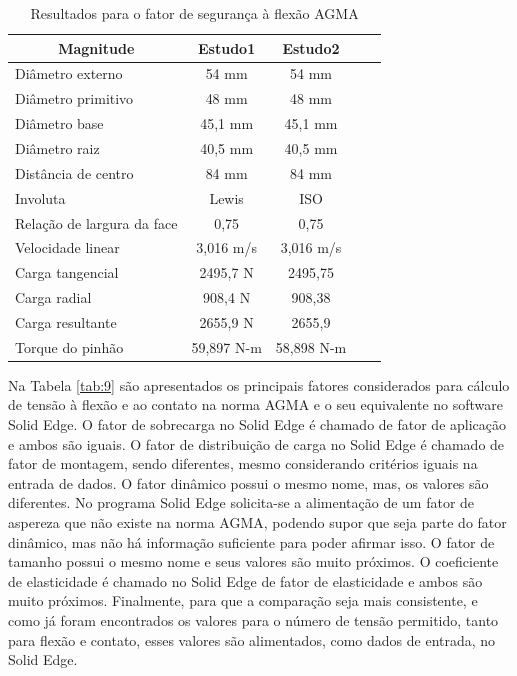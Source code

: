 \documentclass[12pt,a4paper]{article}
\begin{document}
\begin{table}[!htb]
\centering
\caption{{\label{tab:8} Resultados para o fator de segurança à flexão AGMA}}
\begin{tabular}{l c c c c}
\hline
\multicolumn{1}{c}{\textbf{Magnitude}} & \textbf{Estudo1} & \textbf{Estudo2} \\ \hline
Diâmetro externo              & 54 mm       & 54 mm         \\
Diâmetro primitivo            & 48 mm       & 48 mm         \\
Diâmetro base                 & 45,1 mm     & 45,1 mm       \\
Diâmetro raiz                 & 40,5 mm     & 40,5 mm       \\
Distância de centro           & 84 mm       & 84 mm         \\
Involuta                      & Lewis       & ISO           \\
Relação de largura da face    & 0,75        & 0,75          \\
Velocidade linear             & 3,016 m/s   & 3,016 m/s     \\
Carga tangencial              & 2495,7 N    & 2495,75       \\
Carga radial                  & 908,4 N     & 908,38        \\
Carga resultante              & 2655,9 N    & 2655,9        \\
Torque do pinhão              & 59,897 N-m  & 58,898 N-m    \\ \hline
\end{tabular}
\end{table}

Na Tabela {\ref{tab:9}} são apresentados os principais
fatores considerados para cálculo de tensão à flexão e ao contato na
norma AGMA e o seu equivalente no software Solid Edge. O fator de
sobrecarga no Solid Edge é chamado de fator de aplicação e ambos são
iguais. O fator de distribuição de carga no Solid Edge é chamado de
fator de montagem, sendo diferentes, mesmo considerando critérios iguais
na entrada de dados. O fator dinâmico possui o mesmo nome, mas, os
valores são diferentes. No programa Solid Edge solicita-se a alimentação
de um fator de aspereza que não existe na norma AGMA, podendo supor que
seja parte do fator dinâmico, mas não há informação suficiente para
poder afirmar isso. O fator de tamanho possui o mesmo nome e seus
valores são muito próximos. O coeficiente de elasticidade é chamado no
Solid Edge de fator de elasticidade e ambos são muito próximos.
Finalmente, para que a comparação seja mais consistente, e como já foram
encontrados os valores para o número de tensão permitido, tanto para
flexão e contato, esses valores são alimentados, como dados de entrada,
no Solid Edge.
\end{document}
